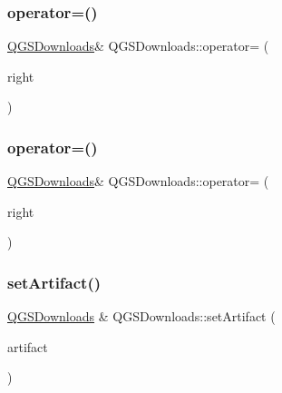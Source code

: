 \mbox{\label{class_q_g_s_downloads_a447e79f9e6d6571773d3e20012f3c30b}} 
\subsubsection{\texorpdfstring{operator=()}{operator=()}\hspace{0.1cm}{\footnotesize\ttfamily [1/2]}}
{\footnotesize\ttfamily \mbox{\hyperlink{class_q_g_s_downloads}{Q\+G\+S\+Downloads}}\& Q\+G\+S\+Downloads\+::operator= (\begin{DoxyParamCaption}\item[{const \mbox{\hyperlink{class_q_g_s_downloads}{Q\+G\+S\+Downloads}} \&}]{right }\end{DoxyParamCaption})\hspace{0.3cm}{\ttfamily [default]}}

\mbox{\label{class_q_g_s_downloads_ab39c1eafef1c1e53afd1d47c8f514582}} 
\subsubsection{\texorpdfstring{operator=()}{operator=()}\hspace{0.1cm}{\footnotesize\ttfamily [2/2]}}
{\footnotesize\ttfamily \mbox{\hyperlink{class_q_g_s_downloads}{Q\+G\+S\+Downloads}}\& Q\+G\+S\+Downloads\+::operator= (\begin{DoxyParamCaption}\item[{\mbox{\hyperlink{class_q_g_s_downloads}{Q\+G\+S\+Downloads}} \&\&}]{right }\end{DoxyParamCaption})\hspace{0.3cm}{\ttfamily [default]}}

\mbox{\label{class_q_g_s_downloads_a085f058705adb95d9b124c665e56ad77}} 
\subsubsection{\texorpdfstring{set\+Artifact()}{setArtifact()}}
{\footnotesize\ttfamily \mbox{\hyperlink{class_q_g_s_downloads}{Q\+G\+S\+Downloads}} \& Q\+G\+S\+Downloads\+::set\+Artifact (\begin{DoxyParamCaption}\item[{const \mbox{\hyperlink{class_q_g_s_download_base}{Q\+G\+S\+Download\+Base}} \&}]{artifact }\end{DoxyParamCaption})}

